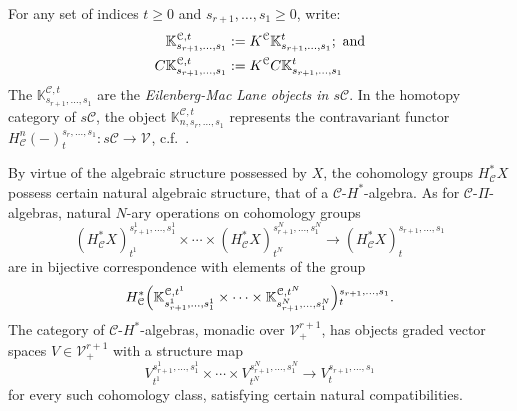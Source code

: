 \documentclass[11pt]{amsart} \renewcommand{\baselinestretch}{1.4}
\theoremstyle{plain}
\theoremstyle{definition}
\newcommand{\DASH}{\mathrm{-}}
\renewcommand{\to}{\longrightarrow}
\newcommand{\calV}{\mathcal{V}}
\newcommand{\calc}{\mathcal{C}}
\newcommand{\vect}[2]{\calV^{#1}_{#2}}
\begin{document}
\begin{Pi-algebras and cohomology algebras}
For any set of indices $t\geq0$ and $s_{r+1},\ldots,s_1\geq0$, write:
\begin{alignat*}{2}
\mathbb{K}^{\calc,t}_{s_{r+1},\ldots,s_1}
&:=
K^\calc \mathbb{K}^{t}_{s_{r+1},\ldots,s_1};\textup{ and}
\\
C\mathbb{K}^{\calc,t}_{s_{r+1},\ldots,s_1}
&:=
K^\calc C\mathbb{K}^{t}_{s_{r+1},\ldots,s_1}%
\end{alignat*}
The $\mathbb{K}^{\calc,t}_{s_{r+1},\ldots,s_1}$ are the \emph{Eilenberg-Mac Lane objects in $s\calc$}. In the homotopy category of $s\calc$, the object $\mathbb{K}^{\calc,t}_{n,s_r,\ldots,s_1}$ represents the contravariant functor $H^n_{\calc}(\DASH)_t^{s_r,\ldots,s_1}:s\calc\to\vect{}{}$,  c.f.\ \cite[Proposition 4.3]{MR1089001}. 




By virtue of the algebraic structure possessed by $X$, the cohomology groups $H_\calc^*X$ possess certain natural algebraic structure, that of a $\calc$-$H^*$-algebra.  As for $\calc$-$\Pi$-algebras, natural $N$-ary operations on cohomology groups
\[(H^*_\calc X)^{s_{r+1}^{1},\ldots,s_{1}^{1}}_{t^1}\times\cdots \times(H^*_\calc X)^{s_{r+1}^{N},\ldots,s_{1}^{N}}_{t^N}\to (H^*_\calc X)^{s_{r+1},\ldots,s_{1}}_{t}\]
are in bijective correspondence with elements of the group
\[ H^*_\calc\Bigl(\mathbb{K}_{s_{r+1}^{1},\ldots,s_{1}^{1}}^{\calc,t^1}\times\cdots\times \mathbb{K}_{s_{r+1}^{N},\ldots,s_{1}^{N}}^{\calc,t^N}\Bigr)\makebox[0cm][l]{}^{s_{r+1},\ldots,s_{1}}_{t}.\]
The category of $\calc$-$H^*$-algebras, monadic over $\vect{r+1}{+}$, has objects graded vector spaces $V\in\vect{r+1}{+}$ with a structure map 
\[V^{s_{r+1}^{1},\ldots,s_{1}^{1}}_{t^1}\times\cdots \times V^{s_{r+1}^{N},\ldots,s_{1}^{N}}_{t^N}\to V^{s_{r+1},\ldots,s_{1}}_{t}\]
for every such cohomology class, satisfying certain natural compatibilities.


\end{Pi-algebras and cohomology algebras}
\end{document}
